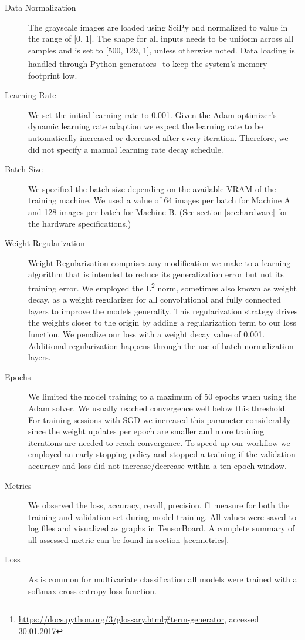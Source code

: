 \begin{description}
	\item[Data Normalization] The grayscale images are loaded using SciPy and normalized to value in the range of [0, 1]. The shape for all inputs needs to be uniform across all samples and is set to [500, 129, 1], unless otherwise noted. Data loading is handled through Python generators\footnote{\url{https://docs.python.org/3/glossary.html#term-generator}, accessed 30.01.2017} to keep the system's memory footprint low.
	\item[Learning Rate] We set the initial learning rate to 0.001. Given the Adam optimizer's dynamic learning rate adaption we expect the learning rate to be automatically increased or decreased after every iteration. Therefore, we did not specify a manual learning rate decay schedule.
	\item[Batch Size] We specified the batch size depending on the available VRAM of the training machine. We used a value of 64 images per batch for Machine A and 128 images per batch for Machine B. (See section \ref{sec:hardware} for the hardware specifications.) 
	\item[Weight Regularization] Weight Regularization comprises any modification we make to a learning algorithm that is intended to reduce its generalization error but not its training error. We employed the L\textsuperscript{2} norm\cite[chapter 7.1.1, p. 231]{Goodfellow-et-al-2016}, sometimes also known as weight decay, as a weight regularizer for all convolutional and fully connected layers to improve the models generality. This regularization strategy drives the weights closer to the origin by adding a regularization term to our loss function. We penalize our loss with a weight decay value of 0.001. Additional regularization happens through the use of batch normalization layers.
	\item[Epochs] We limited the model training to a maximum of 50 epochs when using the Adam solver. We usually reached convergence well below this threshold. For training sessions with SGD we increased this parameter considerably since the weight updates per epoch are smaller and more training iterations are needed to reach convergence. To speed up our workflow we employed an early stopping policy and stopped a training if the validation accuracy and loss did not increase/decrease within a ten epoch window.
	\item[Metrics] We observed the loss, accuracy, recall, precision, f1 measure for both the training and validation set during model training. All values were saved to log files and visualized as graphs in TensorBoard. A complete summary of all assessed metric can be found in section \ref{sec:metrics}.
	\item[Loss] As is common for multivariate classification all models were trained with a softmax cross-entropy loss function. 
	\end{description}


